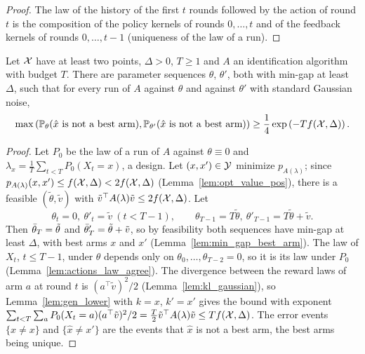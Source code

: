 \begin{proof}
  \leanok
  The law of the history of the first $t$ rounds followed by the action of round $t$ is the
  composition of the policy kernels of rounds $0, \dots, t$ and of the feedback kernels of rounds
  $0, \dots, t - 1$ (uniqueness of the law of a run).
\end{proof}

\begin{lemma}
  \label{lem:opt_lower}
  \leanok
  Let $\mathcal{X}$ have at least two points, $\Delta > 0$, $T \ge 1$ and $A$ an identification algorithm
  with budget $T$. There are parameter sequences $\theta$, $\theta'$, both with min-gap at least
  $\Delta$, such that for every run of $A$ against $\theta$ and against $\theta'$ with standard
  Gaussian noise,
  \[
    \max\left(\mathbb{P}_\theta(\hat x \text{ is not a best arm}),
      \mathbb{P}_{\theta'}(\hat x \text{ is not a best arm})\right)
    \ge \frac14 \exp\left(-T f(\mathcal{X}, \Delta)\right).
  \]
\end{lemma}

\begin{proof}
  \leanok
  Let $P_0$ be the law of a run of $A$ against $\theta \equiv 0$ and
  $\lambda_x = \frac1T \sum_{t < T} P_0(X_t = x)$, a design. Let $(x, x') \in \mathcal{Y}$ minimize
  $p_{A(\lambda)}$; since $p_{A(\lambda)}(x, x') \le f(\mathcal{X}, \Delta) < 2 f(\mathcal{X}, \Delta)$
  (Lemma~\ref{lem:opt_value_pos}), there is a feasible $(\tilde\theta, \tilde v)$ with
  $\tilde v^\top A(\lambda) \tilde v \le 2 f(\mathcal{X}, \Delta)$. Let
  \[
    \theta_t = 0,\ \theta'_t = \tilde v \ (t < T - 1), \qquad
    \theta_{T - 1} = T \tilde\theta,\ \theta'_{T - 1} = T \tilde\theta + \tilde v.
  \]
  Then $\bar{\theta}_T = \tilde\theta$ and $\bar{\theta}'_T = \tilde\theta + \tilde v$, so by feasibility
  both sequences have min-gap at least $\Delta$, with best arms $x$ and $x'$
  (Lemma~\ref{lem:min_gap_best_arm}). The law of $X_t$, $t \le T - 1$, under $\theta$ depends only
  on $\theta_0, \dots, \theta_{T - 2} = 0$, so it is its law under $P_0$
  (Lemma~\ref{lem:actions_law_agree}). The divergence between the reward laws of arm $a$ at round
  $t$ is $(a^\top \tilde v)^2 / 2$ (Lemma~\ref{lem:kl_gaussian}), so Lemma~\ref{lem:gen_lower} with
  $k = x$, $k' = x'$ gives the bound with exponent
  $\sum_{t < T} \sum_a P_0(X_t = a) (a^\top \tilde v)^2 / 2 = \frac{T}{2} \tilde v^\top A(\lambda)
  \tilde v \le T f(\mathcal{X}, \Delta)$. The error events $\{\hat x \ne x\}$ and $\{\hat x \ne x'\}$ are the
  events that $\hat x$ is not a best arm, the best arms being unique.
\end{proof}


